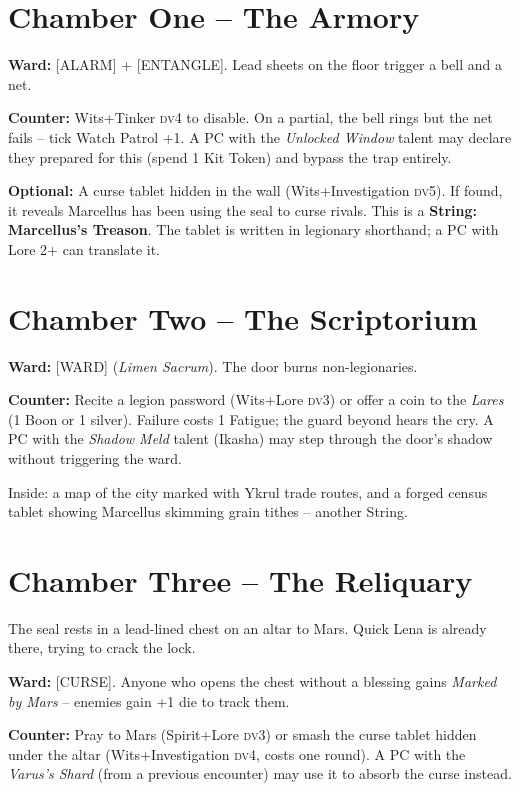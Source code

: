 \documentclass[10pt,twoside]{book}
\newcommand{\tag}[1]{\textsc{[#1]}}
\newcommand{\dv}{\textsc{dv}}
\begin{document}
\section{Chamber One -- The Armory}

\textbf{Ward:} \tag{ALARM} + \tag{ENTANGLE}. Lead sheets on the floor trigger a bell and a net.

\textbf{Counter:} Wits+Tinker \dv 4 to disable. On a partial, the bell rings but the net fails -- tick Watch Patrol +1. A PC with the \textit{Unlocked Window} talent may declare they prepared for this (spend 1 Kit Token) and bypass the trap entirely.

\textbf{Optional:} A curse tablet hidden in the wall (Wits+Investigation \dv 5). If found, it reveals Marcellus has been using the seal to curse rivals. This is a \textbf{String: Marcellus's Treason}. The tablet is written in legionary shorthand; a PC with Lore 2+ can translate it.

\section{Chamber Two -- The Scriptorium}

\textbf{Ward:} \tag{WARD} (\textit{Limen Sacrum}). The door burns non-legionaries.

\textbf{Counter:} Recite a legion password (Wits+Lore \dv 3) or offer a coin to the \textit{Lares} (1 Boon or 1 silver). Failure costs 1 Fatigue; the guard beyond hears the cry. A PC with the \textit{Shadow Meld} talent (Ikasha) may step through the door's shadow without triggering the ward.

Inside: a map of the city marked with Ykrul trade routes, and a forged census tablet showing Marcellus skimming grain tithes -- another String.

\section{Chamber Three -- The Reliquary}

The seal rests in a lead-lined chest on an altar to Mars. Quick Lena is already there, trying to crack the lock.

\textbf{Ward:} \tag{CURSE}. Anyone who opens the chest without a blessing gains \textit{Marked by Mars} -- enemies gain +1 die to track them.

\textbf{Counter:} Pray to Mars (Spirit+Lore \dv 3) or smash the curse tablet hidden under the altar (Wits+Investigation \dv 4, costs one round). A PC with the \textit{Varus's Shard} (from a previous encounter) may use it to absorb the curse instead.
\end{document}
